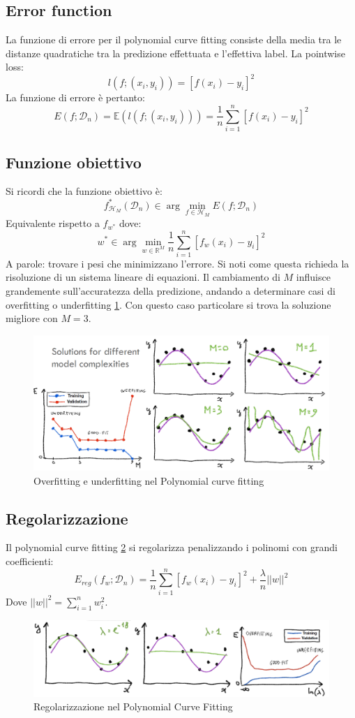 	\subsection{Error function}
	La funzione di errore per il polynomial curve fitting consiste della media tra le distanze quadratiche tra la predizione effettuata e l'effettiva label.
	La pointwise loss:
	$$l(f;(x_i,y_i)) = [f(x_i) - y_i]^2$$
	La funzione di errore \`e pertanto:
	$$E(f;\mathcal{D}_n) = \mathbb{E}(l(f;(x_i,y_i))) = \frac{1}{n}\sum\limits_{i=1}^n[f(x_i)-y_i]^2$$

	\subsection{Funzione obiettivo}
	Si ricordi che la funzione obiettivo \`e:
	$$f^*_{\mathcal{H}_M}(\mathcal{D}_n)\in\arg\min\limits_{f\in\mathcal{H}_M}E(f;\mathcal{D}_n)$$
	Equivalente rispetto a $f_{w^*}$ dove:
	$$w^*\in\arg\min\limits_{w\in\mathbb{R}^M}\frac{1}{n}\sum\limits_{i=1}^n[f_w(x_i)-y_i]^2$$
	A parole: trovare i pesi che minimizzano l'errore. 
	Si noti come questa richieda la risoluzione di un sistema lineare di equazioni.
	Il cambiamento di $M$ influisce grandemente sull'accuratezza della predizione, andando a determinare casi di overfitting o underfitting \ref{fig:chapter02-12}.
	Con questo caso particolare si trova la soluzione migliore con $M=3$.
	
	\begin{figure}
		\centering
		\includegraphics[width=0.6\linewidth]{imgs/chapter2/img12}
		\caption{Overfitting e underfitting nel Polynomial curve fitting}
		\label{fig:chapter02-12}
	\end{figure}
	
	\subsection{Regolarizzazione}
	Il polynomial curve fitting \ref{fig:chapter02-8} si regolarizza penalizzando i polinomi con grandi coefficienti:
	$$E_{reg}(f_w;\mathcal{D}_n) = \frac{1}{n}\sum\limits_{i=1}^n[f_w(x_i)-y_i]^2 + \frac{\lambda}{n}||w||^2$$
	Dove $||w||^2 = \sum\limits_{i = 1}^n w_i^2$.
	
	\begin{figure}
		\centering
		\includegraphics[width=0.6\linewidth]{imgs/chapter2/img8}
		\caption{Regolarizzazione nel Polynomial Curve Fitting}
		\label{fig:chapter02-8}
	\end{figure}
